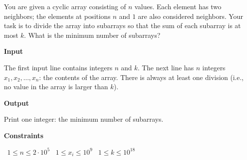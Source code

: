 You are given a cyclic array consisting of $n$ values. Each element has two neighbors; the elements at positions $n$ and $1$ are also considered neighbors.
Your task is to divide the array into subarrays so that the sum of each subarray is at most $k$. What is the minimum number of subarrays?

\vspace{0.3cm}\noindent\textbf{Input}

The first input line contains integers $n$ and $k$.
The next line has $n$ integers $x_1,x_2,\ldots,x_n$: the contents of the array.
There is always at least one division (i.e., no value in the array is larger than $k$).

\vspace{0.3cm}\noindent\textbf{Output}

Print one integer: the minimum number of subarrays.

\vspace{0.3cm}\noindent\textbf{Constraints}

\textbullet\ $1 \le n \le 2 \cdot 10^5$
\textbullet\ $1 \le x_i \le 10^9$
\textbullet\ $1 \le k \le 10^{18}$